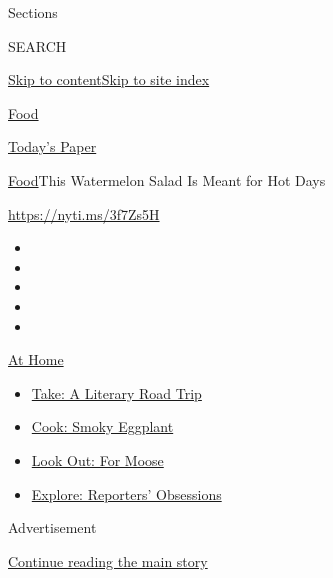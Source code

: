 Sections

SEARCH

\protect\hyperlink{site-content}{Skip to
content}\protect\hyperlink{site-index}{Skip to site index}

\href{https://www.nytimes.com/section/food}{Food}

\href{https://myaccount.nytimes.com/auth/login?response_type=cookie\&client_id=vi}{}

\href{https://www.nytimes.com/section/todayspaper}{Today's Paper}

\href{/section/food}{Food}\textbar{}This Watermelon Salad Is Meant for
Hot Days

\url{https://nyti.ms/3f7Zs5H}

\begin{itemize}
\item
\item
\item
\item
\item
\end{itemize}

\href{https://www.nytimes.com/spotlight/at-home?action=click\&pgtype=Article\&state=default\&region=TOP_BANNER\&context=at_home_menu}{At
Home}

\begin{itemize}
\tightlist
\item
  \href{https://www.nytimes.com/2020/07/28/books/time-for-a-literary-road-trip.html?action=click\&pgtype=Article\&state=default\&region=TOP_BANNER\&context=at_home_menu}{Take:
  A Literary Road Trip}
\item
  \href{https://www.nytimes.com/2020/07/29/magazine/bored-with-your-home-cooking-some-smoky-eggplant-will-fix-that.html?action=click\&pgtype=Article\&state=default\&region=TOP_BANNER\&context=at_home_menu}{Cook:
  Smoky Eggplant}
\item
  \href{https://www.nytimes.com/2020/07/27/travel/moose-michigan-isle-royale.html?action=click\&pgtype=Article\&state=default\&region=TOP_BANNER\&context=at_home_menu}{Look
  Out: For Moose}
\item
  \href{https://www.nytimes.com/interactive/2020/at-home/even-more-reporters-editors-diaries-lists-recommendations.html?action=click\&pgtype=Article\&state=default\&region=TOP_BANNER\&context=at_home_menu}{Explore:
  Reporters' Obsessions}
\end{itemize}

Advertisement

\protect\hyperlink{after-top}{Continue reading the main story}

